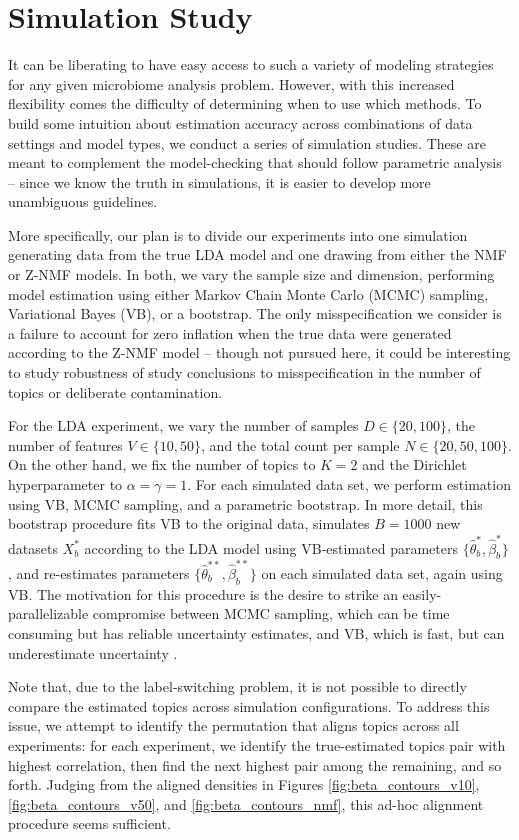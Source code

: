 \documentclass[oupdraft]{bio}
\begin{document}
\section{Simulation Study}

It can be liberating to have easy access to such a variety of modeling
strategies for any given microbiome analysis problem. However, with this
increased flexibility comes the difficulty of determining when to use which
methods. To build some intuition about estimation accuracy across combinations
of data settings and model types, we conduct a series of simulation studies. These are
meant to complement the model-checking that should follow parametric analysis --
since we know the truth in simulations, it is easier to develop more unambiguous
guidelines.

More specifically, our plan is to divide our experiments into one simulation
generating data from the true LDA model and one drawing from either the NMF or
Z-NMF models. In both, we vary the sample size and dimension, performing model
estimation using either Markov Chain Monte Carlo (MCMC) sampling, Variational
Bayes (VB), or a bootstrap. The only misspecification we consider is
a failure to account for zero inflation when the true data were generated
according to the Z-NMF model -- though not pursued here, it could be interesting
to study robustness of study conclusions to misspecification in the number of
topics or deliberate contamination.

For the LDA experiment, we vary the number of samples $D \in \{20, 100\}$, the
number of features $V \in \{10, 50\}$, and the total count per sample $N \in
\{20, 50, 100\}$. On the other hand, we fix the number of topics to $K = 2$ and
the Dirichlet hyperparameter to $\alpha = \gamma = 1$. For each simulated data
set, we perform estimation using VB, MCMC sampling, and a parametric bootstrap.
In more detail, this bootstrap procedure fits VB to the original data, simulates
$B = 1000$ new datasets $X^{\ast}_{b}$ according to the LDA model using
VB-estimated parameters $\{\hat{\theta}^{\ast}_{b}, \hat{\beta}^{\ast}_{b}\}$,
and re-estimates parameters $\{\hat{\theta}^{\ast\ast}_{b},
\hat{\beta}^{\ast\ast}_{b}\}$ on each simulated data set, again using VB. The
motivation for this procedure is the desire to strike an easily-parallelizable
compromise between MCMC sampling, which can be time consuming but has reliable
uncertainty estimates, and VB, which is fast, but can underestimate uncertainty
\citep{wang2005inadequacy}.

Note that, due to the label-switching problem, it is not possible to directly
compare the estimated topics across simulation configurations. To address this
issue, we attempt to identify the permutation that aligns topics across all
experiments: for each experiment, we identify the true-estimated topics pair
with highest correlation, then find the next highest pair among the remaining,
and so forth. Judging from the aligned densities in Figures
\ref{fig:beta_contours_v10}, \ref{fig:beta_contours_v50}, and
\ref{fig:beta_contours_nmf}, this ad-hoc alignment procedure seems sufficient.
\end{document}
